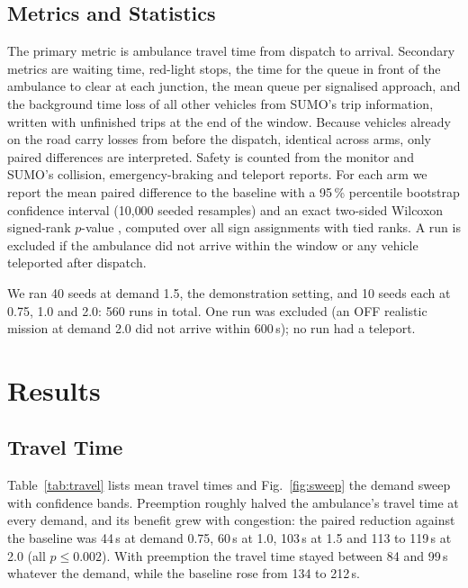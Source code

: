 \documentclass[conference]{IEEEtran}
\begin{document}
\subsection{Metrics and Statistics}

The primary metric is ambulance travel time from dispatch to arrival. Secondary metrics are waiting time, red-light stops, the time for the queue in front of the ambulance to clear at each junction, the mean queue per signalised approach, and the background time loss of all other vehicles from SUMO's trip information, written with unfinished trips at the end of the window. Because vehicles already on the road carry losses from before the dispatch, identical across arms, only paired differences are interpreted. Safety is counted from the monitor and SUMO's collision, emergency-braking and teleport reports. For each arm we report the mean paired difference to the baseline with a 95\,\% percentile bootstrap confidence interval \cite{efron,efron_book} (10{,}000 seeded resamples) and an exact two-sided Wilcoxon signed-rank $p$-value \cite{wilcoxon}, computed over all sign assignments with tied ranks. A run is excluded if the ambulance did not arrive within the window or any vehicle teleported after dispatch.

We ran 40 seeds at demand 1.5, the demonstration setting, and 10 seeds each at 0.75, 1.0 and 2.0: 560 runs in total. One run was excluded (an OFF realistic mission at demand 2.0 did not arrive within 600\,s); no run had a teleport.

\section{Results}

\subsection{Travel Time}

Table~\ref{tab:travel} lists mean travel times and Fig.~\ref{fig:sweep} the demand sweep with confidence bands. Preemption roughly halved the ambulance's travel time at every demand, and its benefit grew with congestion: the paired reduction against the baseline was 44\,s at demand 0.75, 60\,s at 1.0, 103\,s at 1.5 and 113 to 119\,s at 2.0 (all $p\le0.002$). With preemption the travel time stayed between 84 and 99\,s whatever the demand, while the baseline rose from 134 to 212\,s.
\end{document}

